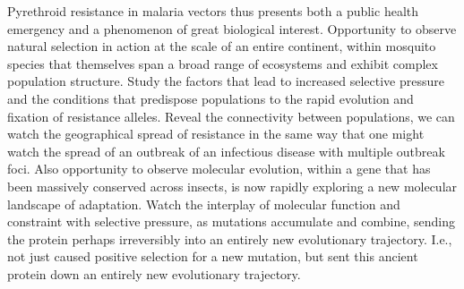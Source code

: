 %
Pyrethroid resistance in malaria vectors thus presents both a public health emergency and a phenomenon of great biological interest.
%
Opportunity to observe natural selection in action at the scale of an entire continent, within mosquito species that themselves span a broad range of ecosystems and exhibit complex population structure.
%
Study the factors that lead to increased selective pressure and the conditions that predispose populations to the rapid evolution and fixation of resistance alleles.
%
Reveal the connectivity between populations, we can watch the geographical spread of resistance in the same way that one might watch the spread of an outbreak of an infectious disease with multiple outbreak foci.
%
Also opportunity to observe molecular evolution, within a gene that has been massively conserved across insects, is now rapidly exploring a new molecular landscape of adaptation.
%
Watch the interplay of molecular function and constraint with selective pressure, as mutations accumulate and combine, sending the protein perhaps irreversibly into an entirely new evolutionary trajectory.
%
I.e., not just caused positive selection for a new mutation, but sent this ancient protein down an entirely new evolutionary trajectory.



